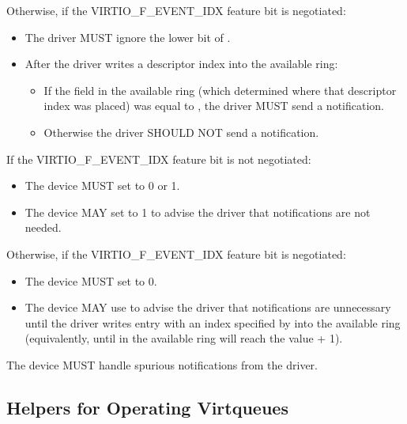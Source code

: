 Otherwise, if the VIRTIO_F_EVENT_IDX feature bit is negotiated:
\begin{itemize}
\item The driver MUST ignore the lower bit of .
\item After the driver writes a descriptor index into the available ring:
  \begin{itemize}
        \item If the  field in the available ring (which determined
          where that descriptor index was placed) was equal to
          , the driver MUST send a notification.
        \item Otherwise the driver SHOULD NOT send a notification.
  \end{itemize}
\end{itemize}

If the VIRTIO_F_EVENT_IDX feature bit is not negotiated:
\begin{itemize}
\item The device MUST set  to 0 or 1.
\item The device MAY set  to 1 to advise
the driver that notifications are not needed.
\end{itemize}

Otherwise, if the VIRTIO_F_EVENT_IDX feature bit is negotiated:
\begin{itemize}
\item The device MUST set  to 0.
\item The device MAY use  to advise the driver that notifications are unnecessary until the driver writes entry with an index specified by  into the available ring (equivalently, until  in the
available ring will reach the value  + 1).
\end{itemize}

The device MUST handle spurious notifications from the driver.

\subsection{Helpers for Operating Virtqueues}\label{sec:Basic Facilities of a Virtio Device / Virtqueues / Helpers for Operating Virtqueues}

